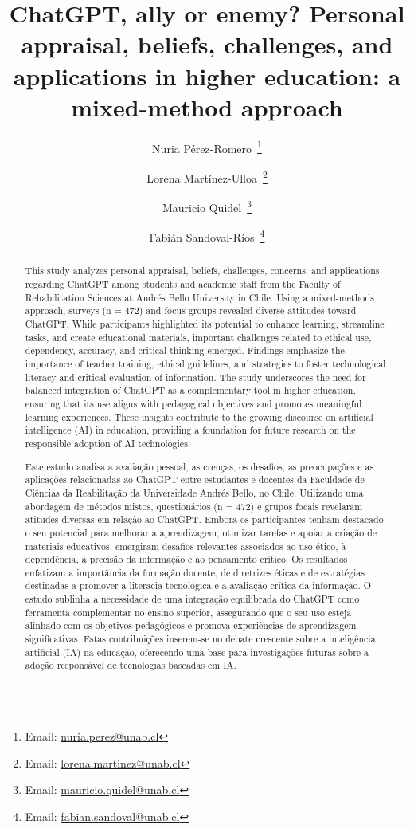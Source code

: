 \documentclass[english]{textolivre}
\title{ChatGPT, ally or enemy? Personal appraisal, beliefs, challenges, and applications in higher education: a mixed-method approach}
\author[1]{Nuria Pérez-Romero~\orcid{0000-0003-2070-5422}\thanks{Email: \href{mailto:nuria.perez@unab.cl}{nuria.perez@unab.cl}}}
\author[1]{Lorena Martínez-Ulloa~\orcid{0000-0002-8788-4376}\thanks{Email: \href{mailto:lorena.martinez@unab.cl}{lorena.martinez@unab.cl}}}
\author[1]{Mauricio Quidel~\orcid{0009-0005-9450-5265}\thanks{Email: \href{mailto:mauricio.quidel@unab.cl}{mauricio.quidel@unab.cl}}}
\author[1]{Fabián Sandoval-Ríos~\orcid{0009-0007-4217-4665}\thanks{Email: \href{mailto:fabian.sandoval@unab.cl}{fabian.sandoval@unab.cl}}}
\affil[1]{Universidad Andrés Bello, Faculty of Rehabilitation Sciences, Santiago, Chile.}
\begin{document}
\maketitle

\begin{polyabstract}
\begin{abstract}
This study analyzes personal appraisal, beliefs, challenges, concerns, and applications regarding ChatGPT among students and academic staff from the Faculty of Rehabilitation Sciences at Andrés Bello University in Chile. Using a mixed-methods approach, surveys (n = 472) and focus groups revealed diverse attitudes toward ChatGPT. While participants highlighted its potential to enhance learning, streamline tasks, and create educational materials, important challenges related to ethical use, dependency, accuracy, and critical thinking emerged. Findings emphasize the importance of teacher training, ethical guidelines, and strategies to foster technological literacy and critical evaluation of information. The study underscores the need for balanced integration of ChatGPT as a complementary tool in higher education, ensuring that its use aligns with pedagogical objectives and promotes meaningful learning experiences. These insights contribute to the growing discourse on artificial intelligence (AI) in education, providing a foundation for future research on the responsible adoption of AI technologies.

\end{abstract}

\begin{portuguese}
\begin{abstract}
Este estudo analisa a avaliação pessoal, as crenças, os desafios, as preocupações e as aplicações relacionadas ao ChatGPT entre estudantes e docentes da Faculdade de Ciências da Reabilitação da Universidade Andrés Bello, no Chile. Utilizando uma abordagem de métodos mistos, questionários (n = 472) e grupos focais revelaram atitudes diversas em relação ao ChatGPT. Embora os participantes tenham destacado o seu potencial para melhorar a aprendizagem, otimizar tarefas e apoiar a criação de materiais educativos, emergiram desafios relevantes associados ao uso ético, à dependência, à precisão da informação e ao pensamento crítico. Os resultados enfatizam a importância da formação docente, de diretrizes éticas e de estratégias destinadas a promover a literacia tecnológica e a avaliação crítica da informação. O estudo sublinha a necessidade de uma integração equilibrada do ChatGPT como ferramenta complementar no ensino superior, assegurando que o seu uso esteja alinhado com os objetivos pedagógicos e promova experiências de aprendizagem significativas. Estas contribuições inserem-se no debate crescente sobre a inteligência artificial (IA) na educação, oferecendo uma base para investigações futuras sobre a adoção responsável de tecnologias baseadas em IA.


\end{abstract}
\end{portuguese}
\end{polyabstract}
\end{document}
